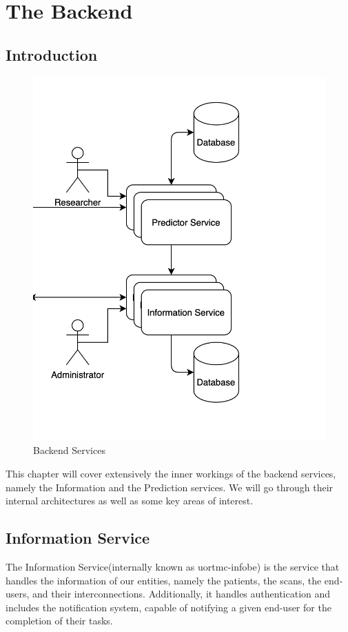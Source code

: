 \chapter{The Backend}
\label{backend}
	\section{Introduction}
		\begin{figure}[H]
			\iftrue
			\caption{Backend Services}
			\centering
			\includegraphics[scale=0.5]{figures/backend}
			\fi
		\end{figure}
		This chapter will cover extensively the inner workings of the backend services, namely the Information and the Prediction services.
		We will go through their internal architectures as well as some key areas of interest.
	\section{Information Service}
		The Information Service(internally known as uortmc-infobe) is the service that handles the information of our entities, 
		namely the patients, the scans, the end-users, and their interconnections. Additionally, it handles authentication and 
		includes the notification system, capable of notifying a given end-user for the completion of their tasks.
